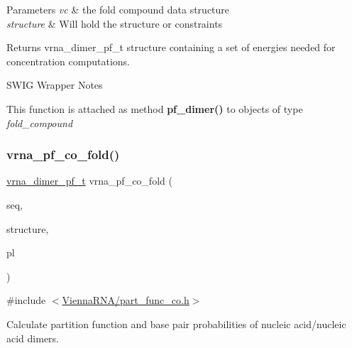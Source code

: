 \begin{DoxyParams}{Parameters}
{\em vc} & the fold compound data structure \\
\hline
{\em structure} & Will hold the structure or constraints \\
\hline
\end{DoxyParams}
\begin{DoxyReturn}{Returns}
vrna\+\_\+dimer\+\_\+pf\+\_\+t structure containing a set of energies needed for concentration computations.
\end{DoxyReturn}
\begin{DoxyRefDesc}{S\+W\+I\+G Wrapper Notes}
\item[\hyperlink{wrappers__wrappers000084}{S\+W\+I\+G Wrapper Notes}]This function is attached as method {\bfseries pf\+\_\+dimer()} to objects of type {\itshape fold\+\_\+compound} \end{DoxyRefDesc}
\mbox{\label{group__pf__cofold_gaf2b846f7ac382686f35ff7b9202fdd5c}} 
\subsubsection{\texorpdfstring{vrna\+\_\+pf\+\_\+co\+\_\+fold()}{vrna\_pf\_co\_fold()}}
{\footnotesize\ttfamily \hyperlink{group__pf__cofold_ga444df1587c9a2ca15b8eb25188f629c3}{vrna\+\_\+dimer\+\_\+pf\+\_\+t} vrna\+\_\+pf\+\_\+co\+\_\+fold (\begin{DoxyParamCaption}\item[{const char $\ast$}]{seq,  }\item[{char $\ast$}]{structure,  }\item[{\hyperlink{group__struct__utils_gab9ac98ab55ded9fb90043b024b915aca}{vrna\+\_\+ep\+\_\+t} $\ast$$\ast$}]{pl }\end{DoxyParamCaption})}



{\ttfamily \#include $<$\hyperlink{part__func__co_8h}{Vienna\+R\+N\+A/part\+\_\+func\+\_\+co.\+h}$>$}



Calculate partition function and base pair probabilities of nucleic acid/nucleic acid dimers. 

